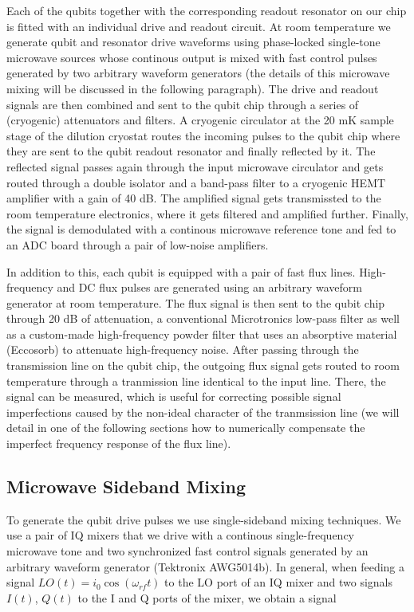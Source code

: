 Each of the qubits together with the corresponding readout resonator on our chip is fitted with an individual drive and readout circuit. At room temperature we generate qubit and resonator drive waveforms using phase-locked single-tone microwave sources whose continous output is mixed with fast control pulses generated by two arbitrary waveform generators (the details of this microwave mixing will be discussed in the following paragraph). The drive and readout signals are then combined and sent to the qubit chip through a series of (cryogenic) attenuators and filters. A cryogenic circulator at the 20 mK sample stage of the dilution cryostat routes the incoming pulses to the qubit chip where they are sent to the qubit readout resonator and finally reflected by it. The reflected signal passes again through the input microwave circulator and gets routed through a double isolator and a band-pass filter to a cryogenic HEMT amplifier with a gain of 40 dB. The amplified signal gets transmissted to the room temperature electronics, where it gets filtered and amplified further. Finally, the signal is demodulated with a continous microwave reference tone and fed to an ADC board through a pair of low-noise amplifiers.

\smallskip

In addition to this, each qubit is equipped with a pair of fast flux lines. High-frequency and DC flux pulses are generated using an arbitrary waveform generator at room temperature. The flux signal is then sent to the qubit chip through 20 dB of attenuation, a conventional Microtronics low-pass filter as well as a custom-made high-frequency powder filter that uses an absorptive material (Eccosorb) to attenuate high-frequency noise. After passing through the transmission line on the qubit chip, the outgoing flux signal gets routed to room temperature through a tranmission line identical to the input line. There, the signal can be measured, which is useful for correcting possible signal imperfections caused by the non-ideal character of the tranmsission line (we will detail in one of the following sections how to numerically compensate the imperfect frequency response of the flux line).

\subsection{Microwave Sideband Mixing}

To generate the qubit drive pulses we use single-sideband mixing techniques. We use a pair of IQ mixers that we drive with a continous single-frequency microwave tone and two synchronized fast control signals generated by an arbitrary waveform generator (Tektronix AWG5014b). In general, when feeding a signal $LO(t) = i_0 \cos{(\omega_{rf} t )}$ to the LO port of an IQ mixer and two signals $I(t)$, $Q(t)$ to the I and Q ports of the mixer, we obtain a signal

